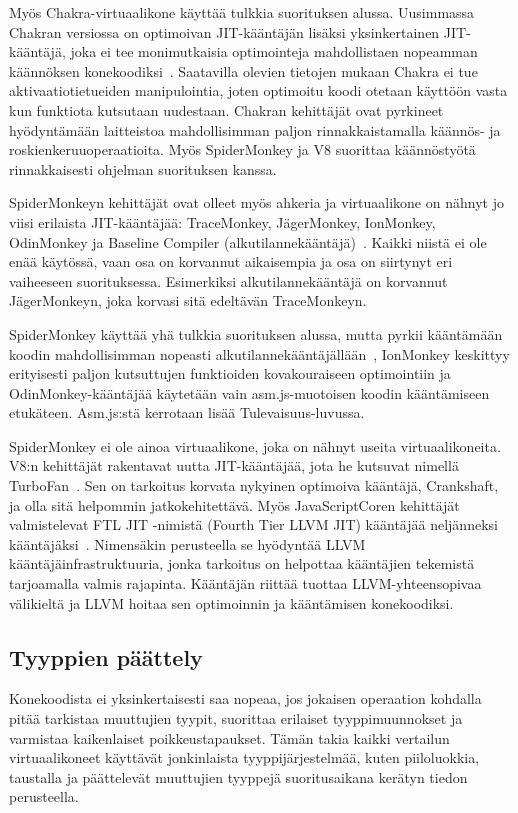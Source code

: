 Myös Chakra-virtuaalikone käyttää tulkkia suorituksen alussa. Uusimmassa Chakran versiossa on optimoivan JIT-kääntäjän lisäksi yksinkertainen JIT-kääntäjä, joka ei tee monimutkaisia optimointeja mahdollistaen nopeamman käännöksen konekoodiksi~\cite{chakra}. Saatavilla olevien tietojen mukaan Chakra ei tue aktivaatiotietueiden manipulointia, joten optimoitu koodi otetaan käyttöön vasta kun funktiota kutsutaan uudestaan. Chakran kehittäjät ovat pyrkineet hyödyntämään laitteistoa mahdollisimman paljon rinnakkaistamalla käännös- ja roskienkeruuoperaatioita. Myös SpiderMonkey ja V8 suorittaa käännöstyötä rinnakkaisesti ohjelman suorituksen kanssa.

SpiderMonkeyn kehittäjät ovat olleet myös ahkeria ja virtuaalikone on nähnyt jo viisi erilaista JIT-kääntäjää: TraceMonkey, JägerMonkey, IonMonkey, OdinMonkey ja Baseline Compiler (alkutilannekääntäjä)~\cite{monkeys}. Kaikki niistä ei ole enää käytössä, vaan osa on korvannut aikaisempia ja osa on siirtynyt eri vaiheeseen suorituksessa. Esimerkiksi alkutilannekääntäjä on korvannut JägerMonkeyn, joka korvasi sitä edeltävän TraceMonkeyn.

SpiderMonkey käyttää yhä tulkkia suorituksen alussa, mutta pyrkii kääntämään koodin mahdollisimman nopeasti alkutilannekääntäjällään~\cite{baseline}, IonMonkey keskittyy erityisesti paljon kutsuttujen funktioiden kovakouraiseen optimointiin ja OdinMonkey-kääntäjää käytetään vain asm.js-muotoisen koodin kääntämiseen etukäteen. Asm.js:stä kerrotaan lisää Tulevaisuus-luvussa.

SpiderMonkey ei ole ainoa virtuaalikone, joka on nähnyt useita virtuaalikoneita. V8:n kehittäjät rakentavat uutta JIT-kääntäjää, jota he kutsuvat nimellä TurboFan~\cite{turbofan}. Sen on tarkoitus korvata nykyinen optimoiva kääntäjä, Crankshaft, ja olla sitä helpommin jatkokehitettävä. Myös JavaScriptCoren kehittäjät valmistelevat FTL JIT -nimistä (Fourth Tier LLVM JIT) kääntäjää neljänneksi kääntäjäksi~\cite{ftljit}. Nimensäkin perusteella se hyödyntää LLVM kääntäjäinfrastruktuuria, jonka tarkoitus on helpottaa kääntäjien tekemistä tarjoamalla valmis rajapinta. Kääntäjän riittää tuottaa LLVM-yhteensopivaa välikieltä ja LLVM hoitaa sen optimoinnin ja kääntämisen konekoodiksi.

\subsection{Tyyppien päättely}

Konekoodista ei yksinkertaisesti saa nopeaa, jos jokaisen operaation kohdalla pitää tarkistaa muuttujien tyypit, suorittaa erilaiset tyyppimuunnokset ja varmistaa kaikenlaiset poikkeustapaukset. Tämän takia kaikki vertailun virtuaalikoneet käyttävät jonkinlaista tyyppijärjestelmää, kuten piiloluokkia, taustalla ja päättelevät muuttujien tyyppejä suoritusaikana kerätyn tiedon perusteella.


